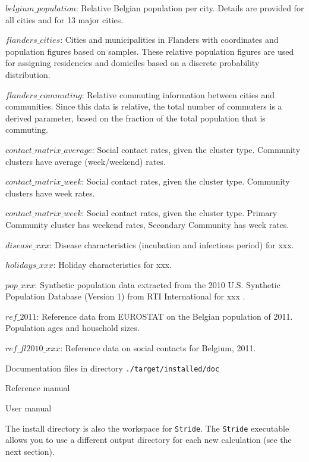 \begin{compactitem}
\begin{compactitem}
			\item $belgium\_population$: Relative Belgian population per city. Details are provided for all cities and for 13 major cities.
        	\item $flanders\_cities$: Cities and municipalities in Flanders with coordinates and population figures based on samples. These relative population figures are used for assigning residencies and domiciles based on a discrete probability distribution.
        	\item $flanders\_commuting$: Relative commuting information between cities and communities. Since this data is relative, the total number of commuters is a derived parameter, based on the fraction of the total population that is commuting.
			\item $contact\_matrix\_average$: Social contact rates, given the cluster type. Community clusters have average (week/weekend) rates.
			\item $contact\_matrix\_week$: Social contact rates, given the cluster type. Community clusters have week rates.
			\item $contact\_matrix\_week$: Social contact rates, given the cluster type. Primary Community cluster has weekend rates, Secondary Community has week rates.
			\item $disease\_xxx$: Disease characteristics (incubation and infectious period) for xxx.
			\item $holidays\_xxx$: Holiday characteristics for xxx.
			\item $pop\_xxx$: Synthetic population data extracted from the 2010 U.S. Synthetic Population Database (Version 1) from RTI International for xxx \cite{wheaton2014a,wheaton2014b}.
			\item $ref\_2011$: Reference data from EUROSTAT on the Belgian population of 2011. Population ages and household sizes.
			\item $ref\_fl2010\_xxx$: Reference data on social contacts for Belgium, 2011.
        \end{compactitem}
%
    \item Documentation files in directory \texttt{./target/installed/doc}
      	\begin{compactitem}
        			\item Reference manual
        			\item User manual
        \end{compactitem}
%
\end{compactitem}

The install directory is also the workspace for \texttt{Stride}. The \texttt{Stride} executable allows you to use a different output directory for each new calculation (see the next section).

